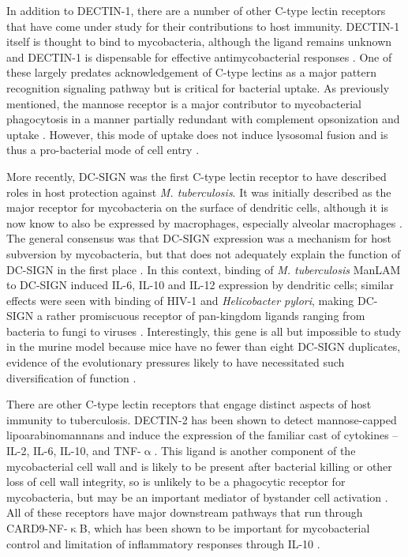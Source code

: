 In addition to DECTIN\hyp{}1, there are a number of other C\hyp{}type lectin receptors that have come under study for their contributions to host immunity. DECTIN\hyp{}1 itself is thought to bind to mycobacteria, although the ligand remains unknown and DECTIN\hyp{}1 is dispensable for effective antimycobacterial responses \citep{Yadav2006, Schorey2008, Rothfuchs2007, Marakalala2011}. One of these largely predates acknowledgement of C\hyp{}type lectins as a major pattern recognition signaling pathway but is critical for bacterial uptake. As previously mentioned, the mannose receptor is a major contributor to mycobacterial phagocytosis in a manner partially redundant with complement opsonization and uptake \citep{Schlesinger1993, Kang1998b}. However, this mode of uptake does not induce lysosomal fusion and is thus a pro\hyp{}bacterial mode of cell entry \citep{AstarieDequeker1999, Goyal2016}. 

More recently, DC\hyp{}SIGN was the first C\hyp{}type lectin receptor to have described roles in host protection against \textit{M. tuberculosis}. It was initially described as the major receptor for mycobacteria on the surface of dendritic cells, although it is now know to also be expressed by macrophages, especially alveolar macrophages \citep{Tailleux2003, Tailleux2005}.  The general consensus was that DC\hyp{}SIGN expression was a mechanism for host subversion by mycobacteria, but that does not adequately explain the function of DC\hyp{}SIGN in the first place \citep{vanKooyk2003}. In this context, binding of \textit{M. tuberculosis} ManLAM \citep{Koppel2004, Maeda2003, Pitarque2005} to DC\hyp{}SIGN induced IL\hyp{}6, IL\hyp{}10 and IL\hyp{}12 expression by dendritic cells; similar effects were seen with binding of HIV\hyp{}1 and \textit{Helicobacter pylori}, making DC\hyp{}SIGN a rather promiscuous receptor of pan\hyp{}kingdom ligands ranging from bacteria to fungi to viruses \citep{Gringhuis2009, denDunnen2009}. Interestingly, this gene is all but impossible to study in the murine model because mice have no fewer than eight DC\hyp{}SIGN duplicates, evidence of the evolutionary pressures likely to have necessitated such diversification of function \citep{Tanne2009, GarciaVallejo2013}.

There are other C\hyp{}type lectin receptors that engage distinct aspects of host immunity to tuberculosis. DECTIN\hyp{}2 has been shown to detect mannose\hyp{}capped lipoarabinomannans and induce the expression of the familiar cast of cytokines -- IL\hyp{}2, IL\hyp{}6, IL\hyp{}10, and TNF\hyp{}$\upalpha$. This ligand is another component of the mycobacterial cell wall and is likely to be present after bacterial killing or other loss of cell wall integrity, so is unlikely to be a phagocytic receptor for mycobacteria, but may be an important mediator of bystander cell activation \citep{Marakalala2017}. All of these receptors have major downstream pathways that run through CARD9\hyp{}NF\hyp{}$\upkappa$B, which has been shown to be important for mycobacterial control and limitation of inflammatory responses through IL\hyp{}10 \citep{Dorhoi2010}.

